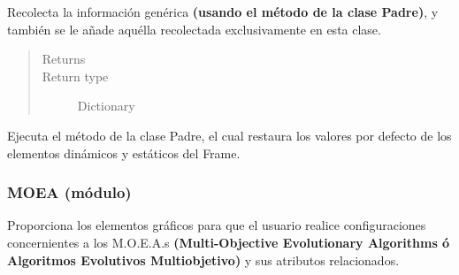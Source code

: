 \documentclass[letterpaper,10pt,english]{sphinxmanual}
\begin{document}
\begin{fulllineitems}
\begin{fulllineitems}
\label{View/Main/GeneticOperator/TemplateGeneticOperator/MutationFrame:View.Main.GeneticOperator.MutationFrame.MutationFrame.get_information}
Recolecta la información genérica \textbf{(usando el método de la clase Padre)}, y también
se le añade aquélla recolectada exclusivamente en esta clase.
\begin{quote}\begin{description}
\item[{Returns}] \leavevmode



\item[{Return type}] \leavevmode
Dictionary

\end{description}\end{quote}

\end{fulllineitems}


\begin{fulllineitems}
\label{View/Main/GeneticOperator/TemplateGeneticOperator/MutationFrame:View.Main.GeneticOperator.MutationFrame.MutationFrame.restore_settings}
Ejecuta el método de la clase Padre, el cual restaura los valores por 
defecto de los elementos dinámicos y estáticos del Frame.

\end{fulllineitems}


\end{fulllineitems}



\subsubsection{MOEA (módulo)}
\label{View/Main/MOEA/MOEA::doc}\label{View/Main/MOEA/MOEA:moea-modulo}
Proporciona los elementos gráficos para que el usuario realice
configuraciones concernientes a los M.O.E.A.s \textbf{(Multi-Objective Evolutionary Algorithms
ó Algoritmos Evolutivos Multiobjetivo)} y sus atributos relacionados.
\end{document}
